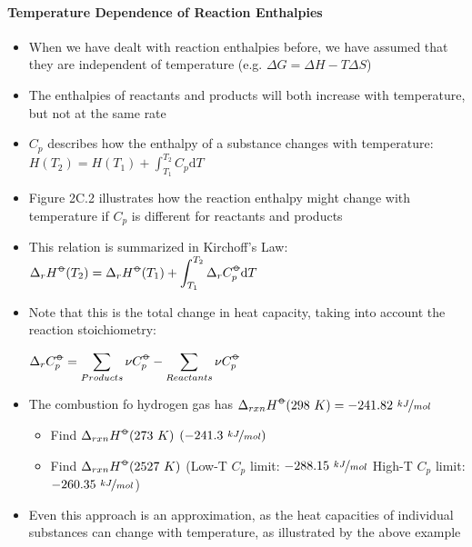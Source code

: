 \documentclass[12pt, openany, letterpaper]{memoir}
\begin{document}
\paragraph{Temperature Dependence of Reaction Enthalpies}
\begin{itemize}
	\item When we have dealt with reaction enthalpies before, we have assumed that they are independent of temperature (e.g. $\Delta G = \Delta H-T\Delta S$)
	\item The enthalpies of reactants and products will both increase with temperature, but not at the same rate
	\item $C_{p}$ describes how the enthalpy of a substance changes with temperature:
	      $H(T_2)=H(T_1)+\displaystyle\int_{T_1}^{T_2}C_p\mathrm{d}T$
	\item Figure 2C.2 illustrates how the reaction enthalpy might change with temperature if $C_p$ is different for reactants and products
	\item This relation is summarized in Kirchoff's Law: $\Delta_rH^{\std}(T_2)=\Delta_rH^{\std}(T_1)+\displaystyle\int_{T_1}^{T_2}\Delta_rC_p^{\std}\mathrm{d}T$
	\item Note that this is the total change in heat capacity, taking into account the reaction stoichiometry:

	      $\Delta_rC_p^{\std}=\displaystyle\sum\limits_{Products}\nu C_p^{\std} - \displaystyle\sum\limits_{Reactants}\nu C_p^{\std}$
	\item The combustion fo hydrogen gas has $\Delta_{rxn}H^{\std}(298~K)=-241.82~\nicefrac{kJ}{mol}$
	      \begin{itemize}
		      \item Find $\Delta_{rxn}H^{\std}(273~K)$ $\left(-241.3~\nicefrac{kJ}{mol}\right)$
		      \item Find $\Delta_{rxn}H^{\std}(2527~K)$ (Low-T $C_p$ limit: $-288.15~\nicefrac{kJ}{mol}$ High-T $C_p$ limit: $-260.35~\nicefrac{kJ}{mol}$)
	      \end{itemize}
	\item Even this approach is an approximation, as the heat capacities of individual substances can change with temperature, as illustrated by the above example
\end{itemize}
\end{document}
